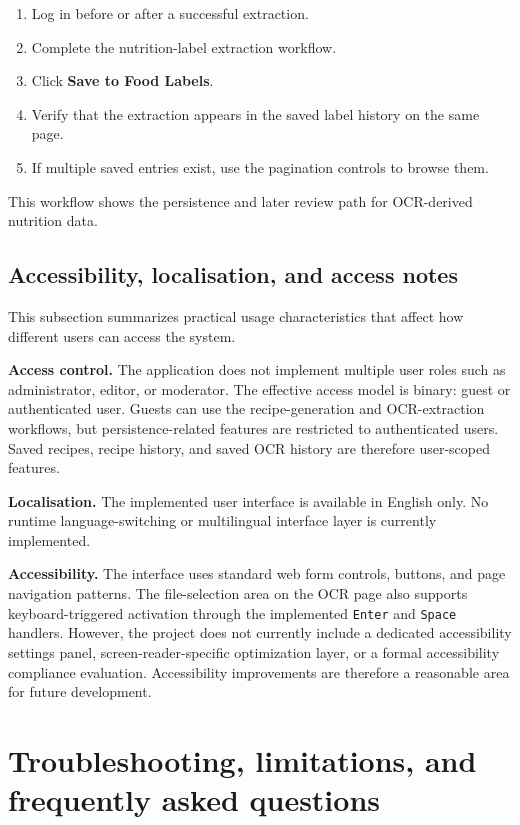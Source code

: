 \begin{enumerate}
	\item Log in before or after a successful extraction.
	\item Complete the nutrition-label extraction workflow.
	\item Click \textbf{Save to Food Labels}.
	\item Verify that the extraction appears in the saved label history
	on the same page.
	\item If multiple saved entries exist, use the pagination controls to
	browse them.
\end{enumerate}

This workflow shows the persistence and later review path for
OCR-derived nutrition data.

\subsection{Accessibility, localisation, and access notes}

This subsection summarizes practical usage characteristics that affect
how different users can access the system.

\textbf{Access control.} The application does not implement multiple
user roles such as administrator, editor, or moderator. The effective
access model is binary: guest or authenticated user. Guests can use
the recipe-generation and OCR-extraction workflows, but
persistence-related features are restricted to authenticated users.
Saved recipes, recipe history, and saved OCR history are therefore
user-scoped features.

\textbf{Localisation.} The implemented user interface is available in
English only. No runtime language-switching or multilingual interface
layer is currently implemented.

\textbf{Accessibility.} The interface uses standard web form controls,
buttons, and page navigation patterns. The file-selection area on the
OCR page also supports keyboard-triggered activation through the
implemented \texttt{Enter} and \texttt{Space} handlers. However, the
project does not currently include a dedicated accessibility settings
panel, screen-reader-specific optimization layer, or a formal
accessibility compliance evaluation. Accessibility improvements are
therefore a reasonable area for future development.

\section{Troubleshooting, limitations, and frequently asked questions}

